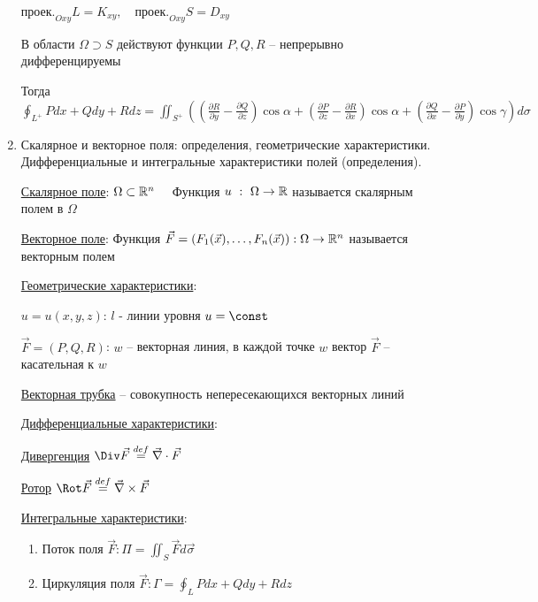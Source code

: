 \documentclass[12pt]{article}
\begin{document}
\begin{enumerate}
        $\text{проек.}_{Oxy} L = K_{xy}, \quad \text{проек.}_{Oxy} S = D_{xy}$

        В области $\Omega \supset S$ действуют функции $P, Q, R$ -- непрерывно дифференцируемы

        Тогда $\oint_{L^+} Pdx + Qdy + Rdz = \iint_{S^+} \left(\left(\frac{\partial R}{\partial y} - \frac{\partial Q}{\partial z}\right)\cos\alpha +
        \left(\frac{\partial P}{\partial z} - \frac{\partial R}{\partial x}\right)\cos\alpha + \left(\frac{\partial Q}{\partial x} - \frac{\partial P}{\partial y}\right)\cos\gamma\right) d\sigma$


        \item Скалярное и векторное поля: определения, геометрические характеристики. Дифференциальные и интегральные характеристики полей (определения).

        \hyperlink{scalarfield}{Скалярное поле}: $\Omega \subset \mathbb{R}^n \quad$ Функция $u \ : \ \Omega \to \mathbb{R}$ называется скалярным полем в $\Omega$

        \hyperlink{vectorfield}{Векторное поле}: Функция $\vec{F} = (F_1(\vec{x}), \dots, F_n(\vec{x})) : \Omega \to \mathbb{R}^n$ называется векторным полем

        \hyperlink{scalarandvectorfieldgeometric}{Геометрические характеристики}:

        $u = u(x, y, z)$: $l$ - линии уровня $u = \const$

        $\vec{F} = (P, Q, R)$: $w$ -- векторная линия, в каждой точке $w$ вектор $\vec{F}$ -- касательная к $w$

        \underline{Векторная трубка} -- совокупность непересекающихся векторных линий

        \hyperlink{differentialcharacteristics}{Дифференциальные характеристики}:

        \hyperlink{divergence}{Дивергенция} $\Div \vec{F} \stackrel{def}{=} \vec\nabla \cdot \vec{F}$

        \hyperlink{rotor}{Ротор} $\Rot \vec{F} \stackrel{def}{=} \vec\nabla \times \vec{F}$

        \hyperlink{integralcharacteristics}{Интегральные характеристики}:

        \begin{enumerate}
            \item Поток поля $\vec{F}: \Pi = \iint_S \vec{F}d\vec{\sigma}$

            \item Циркуляция поля $\vec{F}: \Gamma = \oint_L Pdx + Qdy + Rdz$
        \end{enumerate}


\end{enumerate}
\end{document}
